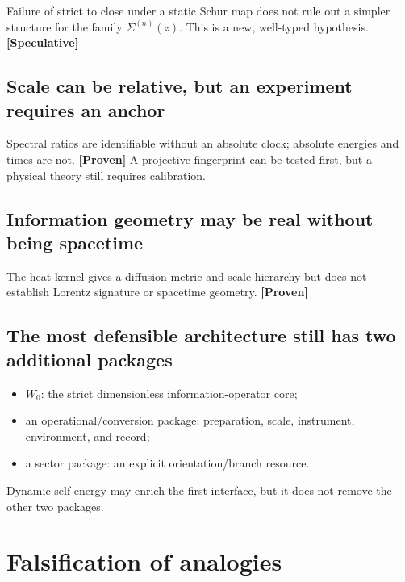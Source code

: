 \documentclass[11pt,a4paper,openany]{report}
\newcommand{\statusProven}{\textcolor{fingreen}{[Proven]}}
\newcommand{\statusSpeculative}{\textcolor{finorange}{[Speculative]}}
\begin{document}
Failure of strict to close under a static Schur map does not rule out a simpler structure for the family \(\Sigma^{(n)}(z)\). This is a new, well-typed hypothesis. \textbf{\statusSpeculative{}}

\section{Scale can be relative, but an experiment requires an anchor}

Spectral ratios are identifiable without an absolute clock; absolute energies and times are not. \textbf{\statusProven{}} A projective fingerprint can be tested first, but a physical theory still requires calibration.

\section{Information geometry may be real without being spacetime}

The heat kernel gives a diffusion metric and scale hierarchy but does not establish Lorentz signature or spacetime geometry. \textbf{\statusProven{}}

\section{The most defensible architecture still has two additional packages}

\begin{itemize}
\item 
\(W_0\): the strict dimensionless information-operator core;

\item 
an operational/\allowbreak{}conversion package: preparation, scale, instrument, environment, and record;

\item 
a sector package: an explicit orientation/\allowbreak{}branch resource.

\end{itemize}

Dynamic self-energy may enrich the first interface, but it does not remove the other two packages.

\chapter{Falsification of analogies}
\end{document}
